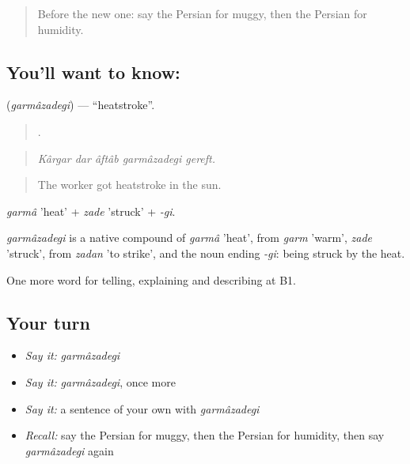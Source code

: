\begin{quote}
Before the new one: say the Persian for muggy, then the Persian for humidity.
\end{quote}

\subsection*{You'll want to know: }
\textbf{} (\emph{garmâzadegi}) — \textquotedblleft{}heatstroke\textquotedblright{}.

\begin{quote}
    .
\end{quote}

\begin{quote}
\emph{Kârgar dar âftâb garmâzadegi gereft.}
\end{quote}

\begin{quote}
The worker got heatstroke in the sun.
\end{quote}

\emph{garmâ} 'heat' + \emph{zade} 'struck' + \emph{-gi}.

\begin{cousinweb}
\emph{garmâzadegi} is a native compound of \emph{garmâ} 'heat', from \emph{garm} 'warm', \emph{zade} 'struck', from \emph{zadan} 'to strike', and the noun ending \emph{-gi}: being struck by the heat.
\end{cousinweb}

\begin{grammarlens}[title={What you've built}]
One more word for telling, explaining and describing at B1.
\end{grammarlens}

\subsection*{Your turn}
\begin{itemize}
\raggedright
  \item \emph{Say it:} \emph{garmâzadegi}
  \item \emph{Say it:} \emph{garmâzadegi}, once more
  \item \emph{Say it:} a sentence of your own with \emph{garmâzadegi}
  \item \emph{Recall:} say the Persian for muggy, then the Persian for humidity, then say \emph{garmâzadegi} again
\end{itemize}

